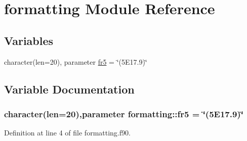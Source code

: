 \hypertarget{namespaceformatting}{
\section{formatting Module Reference}
\label{namespaceformatting}
}
\subsection*{Variables}
\begin{DoxyCompactItemize}
\item 
character(len=20), parameter \hyperlink{namespaceformatting_a552aa51d2fb15a338e371114fd02c6e1}{fr5} = \char`\"{}(5E17.9)\char`\"{}
\end{DoxyCompactItemize}


\subsection{Variable Documentation}
\hypertarget{namespaceformatting_a552aa51d2fb15a338e371114fd02c6e1}{
\subsubsection[{fr5}]{\setlength{\rightskip}{0pt plus 5cm}character(len=20),parameter {\bf formatting::fr5} = \char`\"{}(5E17.9)\char`\"{}}}
\label{namespaceformatting_a552aa51d2fb15a338e371114fd02c6e1}


Definition at line 4 of file formatting.f90.

